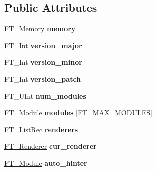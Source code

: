 \subsection*{Public Attributes}
\begin{DoxyCompactItemize}
\item 
\mbox{\label{structFT__LibraryRec___afe392b83bc018b1b1fb25459f68a5861}} 
F\+T\+\_\+\+Memory {\bfseries memory}
\item 
\mbox{\label{structFT__LibraryRec___a218c30755bac8b58592d70148c938e38}} 
F\+T\+\_\+\+Int {\bfseries version\+\_\+major}
\item 
\mbox{\label{structFT__LibraryRec___a211d591fbc89d9471715638809865290}} 
F\+T\+\_\+\+Int {\bfseries version\+\_\+minor}
\item 
\mbox{\label{structFT__LibraryRec___a51ab560542e78c5e65e248b5a94f66a1}} 
F\+T\+\_\+\+Int {\bfseries version\+\_\+patch}
\item 
\mbox{\label{structFT__LibraryRec___af75d01983c4d91bb3373583424750afa}} 
F\+T\+\_\+\+U\+Int {\bfseries num\+\_\+modules}
\item 
\mbox{\label{structFT__LibraryRec___a961e28496c4c78ab0e935693795442e6}} 
\hyperlink{structFT__ModuleRec__}{F\+T\+\_\+\+Module} {\bfseries modules} \mbox{[}F\+T\+\_\+\+M\+A\+X\+\_\+\+M\+O\+D\+U\+L\+ES\mbox{]}
\item 
\mbox{\label{structFT__LibraryRec___ad9503f71cf4e4d88edfbdda59eb5e43d}} 
\hyperlink{structFT__ListRec__}{F\+T\+\_\+\+List\+Rec} {\bfseries renderers}
\item 
\mbox{\label{structFT__LibraryRec___a528dd3298756070ecad7d0f82f009294}} 
\hyperlink{structFT__RendererRec__}{F\+T\+\_\+\+Renderer} {\bfseries cur\+\_\+renderer}
\item 
\mbox{\label{structFT__LibraryRec___ae608b33b223905d4d70b782ed7ec8c78}} 
\hyperlink{structFT__ModuleRec__}{F\+T\+\_\+\+Module} {\bfseries auto\+\_\+hinter}
\item 

\end{DoxyCompactItemize}
